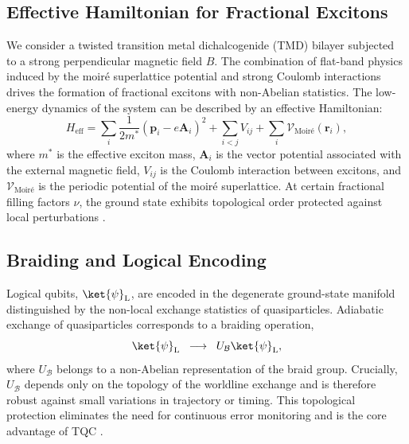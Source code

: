 \documentclass[aps,prl,twocolumn,superscriptaddress]{revtex4-2}
\begin{document}
\subsection{Effective Hamiltonian for Fractional Excitons}
We consider a twisted transition metal dichalcogenide (TMD) bilayer subjected to a strong perpendicular magnetic field $B$. The combination of flat-band physics induced by the moiré superlattice potential and strong Coulomb interactions drives the formation of fractional excitons with non-Abelian statistics. The low-energy dynamics of the system can be described by an effective Hamiltonian:
\begin{equation}
H_{\text{eff}} = \sum_{i} \frac{1}{2m^{*}} \left( \mathbf{p}_i - e \mathbf{A}_i \right)^{2}
+ \sum_{i<j} V_{ij} 
+ \sum_{i} \mathcal{V}_{\text{Moiré}}(\mathbf{r}_i),
\end{equation}
where $m^{*}$ is the effective exciton mass, $\mathbf{A}_i$ is the vector potential associated with the external magnetic field, $V_{ij}$ is the Coulomb interaction between excitons, and $\mathcal{V}_{\text{Moiré}}$ is the periodic potential of the moiré superlattice. At certain fractional filling factors $\nu$, the ground state exhibits topological order protected against local perturbations \cite{Laughlin1983,Regnault2011,Bernevig2012}.

\subsection{Braiding and Logical Encoding}
Logical qubits, $\ket{\psi}_{\text{L}}$, are encoded in the degenerate ground-state manifold distinguished by the non-local exchange statistics of quasiparticles. Adiabatic exchange of quasiparticles corresponds to a braiding operation,
\begin{equation}
\ket{\psi}_{\text{L}} \;\;\longrightarrow\;\; U_{\mathcal{B}} \ket{\psi}_{\text{L}},
\end{equation}
where $U_{\mathcal{B}}$ belongs to a non-Abelian representation of the braid group. Crucially, $U_{\mathcal{B}}$ depends only on the topology of the worldline exchange and is therefore robust against small variations in trajectory or timing. This topological protection eliminates the need for continuous error monitoring and is the core advantage of TQC \cite{Kitaev2003,Nayak2008,Sarma2015}.
\end{document}
